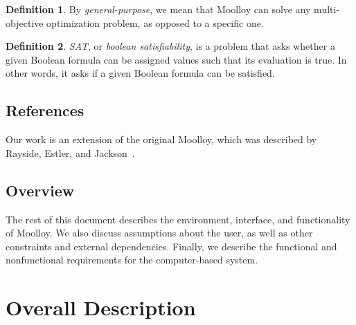\documentclass[11pt]{article}
\theoremstyle{definition}
\newtheorem{mydef}{Definition}
\begin{document}
\begin{mydef}
By \textit{general-purpose}, we mean that Moolloy can solve any
multi-objective optimization problem, as opposed to a specific one.
\end{mydef}

\begin{mydef}
\textit{SAT}, or \textit{boolean satisfiability}, is a problem that
asks whether a given Boolean formula can be assigned values such that
its evaluation is true. In other words, it asks if a given Boolean
formula can be satisfied.
\end{mydef}

\subsection{References}

Our work is an extension of the original Moolloy, which was described
by Rayside, Estler, and Jackson~\cite{ref:Rayside09}.

\subsection{Overview}

The rest of this document describes the environment, interface, and
functionality of Moolloy. We also discuss assumptions about the user,
as well as other constraints and external dependencies. Finally, we
describe the functional and nonfunctional requirements for the
computer-based system.

\section{Overall Description}
\end{document}
